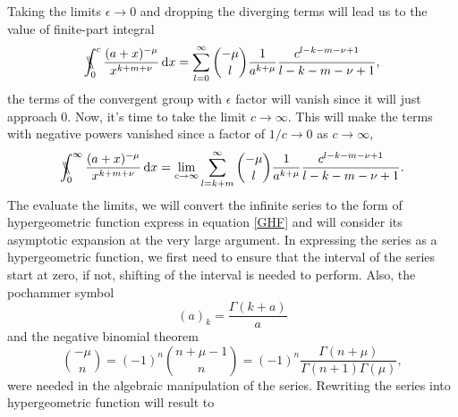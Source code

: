 Taking the limits $\epsilon \to 0$ and dropping the diverging terms will lead us to the value of finite-part integral 
\begin{align}
\begin{split} 
    \bbint{0}{c} \frac{(a+x)^{-\mu}}{x^{k+m+\nu}} \, \mathrm{d}x = \sum_{l=0}^{\infty} \binom{-\mu}{l} \frac{1}{a^{k+\mu}} \frac{c^{l-k-m-\nu+1}}{l-k-m-\nu+1},
\end{split}
\end{align}
the terms of the convergent group with $\epsilon$ factor will vanish since it will just approach 0. Now, it's time to take the limit $c \to \infty$. This will make the terms with negative powers vanished since a factor of $1/c \to 0$ as $c \to \infty$,
\begin{align}
\begin{split} 
    \bbint{0}{\infty} \frac{(a+x)^{-\mu}}{x^{k+m+\nu}} \, \mathrm{d}x = \lim_{c \to \infty} \sum_{l=k+m}^{\infty} \binom{-\mu}{l} \frac{1}{a^{k+\mu}} \frac{c^{l-k-m-\nu+1}}{l-k-m-\nu+1}.
\end{split}
\end{align}
The evaluate the limits, we will convert the infinite series to the form of hypergeometric function express in equation \eqref{GHF} and will consider its asymptotic expansion at the very large argument. In expressing the series as a hypergeometric function, we first need to ensure that the interval of the series start at zero, if not, shifting of the interval is needed to perform. Also, the pochammer symbol \cite[pg. 3, Eq. 1.1.1.2]{slater1966generalized}
\begin{equation}
    (a)_k = \frac{\Gamma(k+a)}{a}
\end{equation}
and the negative binomial theorem \cite{nbt}
\begin{equation}
    \binom{-\mu}{n} = (-1)^{n} \binom{n+\mu-1}{n} = (-1)^{n} \frac{\Gamma(n+\mu)}{\Gamma(n+1)\Gamma(\mu)},
\end{equation}
were needed in the algebraic manipulation of the series. Rewriting the series into hypergeometric function will result to

